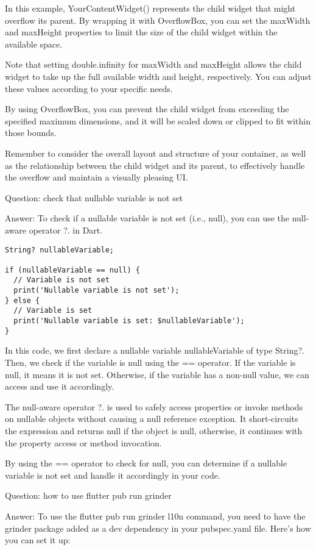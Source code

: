 In this example, YourContentWidget() represents the child widget that might overflow its parent. By wrapping it with 
OverflowBox, you can set the maxWidth and maxHeight properties to limit the size of the child widget within the 
available space.

Note that setting double.infinity for maxWidth and maxHeight allows the child widget to take up the full available 
width and height, respectively. You can adjust these values according to your specific needs.

By using OverflowBox, you can prevent the child widget from exceeding the specified maximum dimensions, and it will 
be scaled down or clipped to fit within those bounds.

Remember to consider the overall layout and structure of your container, as well as the relationship between the child 
widget and its parent, to effectively handle the overflow and maintain a visually pleasing UI.

Question: check that nullable variable is not set

Answer: To check if a nullable variable is not set (i.e., null), you can use the null-aware operator ?. in Dart. 

\begin{lstlisting}
String? nullableVariable;

if (nullableVariable == null) {
  // Variable is not set
  print('Nullable variable is not set');
} else {
  // Variable is set
  print('Nullable variable is set: $nullableVariable');
}
\end{lstlisting}

In this code, we first declare a nullable variable nullableVariable of type String?. Then, we check if the variable 
is null using the == operator. If the variable is null, it means it is not set. Otherwise, if the variable has a 
non-null value, we can access and use it accordingly.

The null-aware operator ?. is used to safely access properties or invoke methods on nullable objects without causing 
a null reference exception. It short-circuits the expression and returns null if the object is null, otherwise, it 
continues with the property access or method invocation.

By using the == operator to check for null, you can determine if a nullable variable is not set and handle it 
accordingly in your code.


Question: how to use flutter pub run grinder

Answer: To use the flutter pub run grinder l10n command, you need to have the grinder package added as a dev 
dependency in your pubspec.yaml file. Here's how you can set it up:

